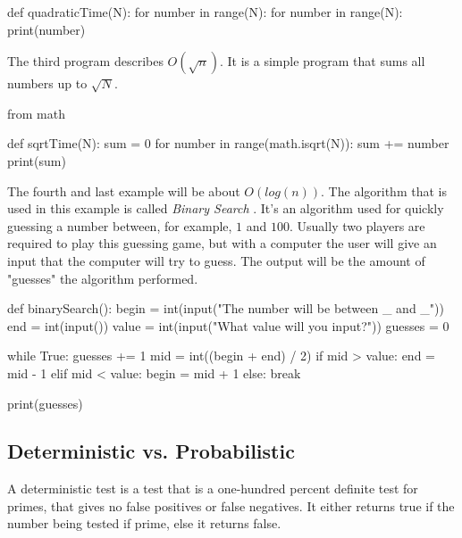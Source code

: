 \documentclass[main.tex]{subfiles}
\begin{document}
\begin{python}
    def quadraticTime(N):
        for number in range(N):
            for number in range(N):
                print(number)
\end{python}

\vspace{10mm}

The third program describes $O(\sqrt{n})$. It is a simple program that sums all numbers up to $\sqrt{N}$.

\begin{python}
    from math

    def sqrtTime(N):
        sum = 0
        for number in range(math.isqrt(N)):
            sum += number
        print(sum)
\end{python}

\vspace{10mm}

The fourth and last example will be about $O(log (n))$. The algorithm that is used in this example is called \textit{Binary Search} \cite{algh:binary_search}. It's an algorithm used for quickly guessing a number between, for example, $1$ and $100$. Usually two players are required to play this guessing game, but with a computer the user will give an input that the computer will try to guess. The output will be the amount of "guesses" the algorithm performed.

\begin{python}
    def binarySearch():
        begin = int(input("The number will be between _ and _\n"))
        end = int(input())
        value = int(input("What value will you input?\n"))
        guesses = 0

        while True:
            guesses += 1
            mid = int((begin + end) / 2)
            if mid > value:
                end = mid - 1
            elif mid < value:
                begin = mid + 1
            else:
                break

    print(guesses)

\end{python}

\subsection{Deterministic vs. Probabilistic}
A deterministic test is a test that is a one-hundred percent definite test for primes, that gives no false positives or false negatives. It either returns true if the number being tested if prime, else it returns false. 
\end{document}
